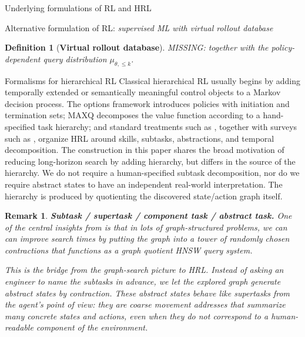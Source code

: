 \documentclass[11pt]{article}
\newtheorem{definition}[subsubsection]{Definition}
\newtheorem{remark}[subsubsection]{Remark}
\begin{document}
\begin{section}{Underlying formulations of RL and HRL}
\begin{subsection}{Alternative formulation of RL: {\em supervised ML with virtual rollout database}}
\begin{definition}[{\bf Virtual rollout database}]
{\color{blue} MISSING: together with the policy-dependent query distribution $\mu_{\theta,\le k}$. }
\end{definition}

\end{subsection}

\begin{subsection}{Formalisms for hierarchical RL}
Classical hierarchical RL usually begins by adding temporally extended or semantically meaningful control objects to a Markov decision process. The options framework \cite{SPS} introduces policies with initiation and termination sets; MAXQ \cite{Diet} decomposes the value function according to a hand-specified task hierarchy; and standard treatments such as \cite{SBRL}, together with surveys such as \cite{PSTQ,HutsebautBuysseHRLSurvey}, organize HRL around skills, subtasks, abstractions, and temporal decomposition. The construction in this paper shares the broad motivation of reducing long-horizon search by adding hierarchy, but differs in the source of the hierarchy. We do not require a human-specified subtask decomposition, nor do we require abstract states to have an independent real-world interpretation. The hierarchy is produced by quotienting the discovered state/action graph itself.

\begin{remark}
{\bf Subtask / supertask / component task / abstract task.}
\normalfont
One of the central insights from \cite{MalikThesis} is that in lots of graph-structured problems, we can can improve search times by putting the graph into a tower of randomly chosen contractions that functions as a {\em graph quotient HNSW} query system.

This is the bridge from the graph-search picture to HRL. Instead of asking an engineer to name the subtasks in advance, we let the explored graph generate abstract states by contraction. These abstract states behave like supertasks from the agent's point of view: they are coarse movement addresses that summarize many concrete states and actions, even when they do not correspond to a human-readable component of the environment.


\end{remark}
\end{subsection}
\end{section}
\end{document}
